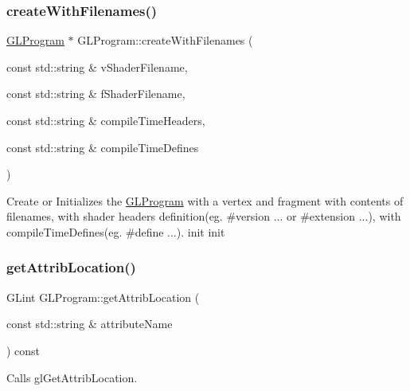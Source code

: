 \subsubsection{\texorpdfstring{create\+With\+Filenames()}{createWithFilenames()}\hspace{0.1cm}{\footnotesize\ttfamily [3/3]}}
{\footnotesize\ttfamily \hyperlink{classGLProgram}{G\+L\+Program} $\ast$ G\+L\+Program\+::create\+With\+Filenames (\begin{DoxyParamCaption}\item[{const std\+::string \&}]{v\+Shader\+Filename,  }\item[{const std\+::string \&}]{f\+Shader\+Filename,  }\item[{const std\+::string \&}]{compile\+Time\+Headers,  }\item[{const std\+::string \&}]{compile\+Time\+Defines }\end{DoxyParamCaption})\hspace{0.3cm}{\ttfamily [static]}}

Create or Initializes the \hyperlink{classGLProgram}{G\+L\+Program} with a vertex and fragment with contents of filenames, with shader headers definition(eg. \#version ... or \#extension ...), with compile\+Time\+Defines(eg. \#define ...).  init  init \mbox{\label{classGLProgram_a2bdaba0068ae955ee8395f6017f7781b}} 
\subsubsection{\texorpdfstring{get\+Attrib\+Location()}{getAttribLocation()}\hspace{0.1cm}{\footnotesize\ttfamily [1/2]}}
{\footnotesize\ttfamily G\+Lint G\+L\+Program\+::get\+Attrib\+Location (\begin{DoxyParamCaption}\item[{const std\+::string \&}]{attribute\+Name }\end{DoxyParamCaption}) const}

Calls gl\+Get\+Attrib\+Location. \mbox{\label{classGLProgram_a2bdaba0068ae955ee8395f6017f7781b}} 
